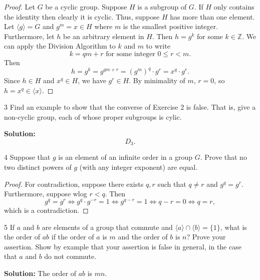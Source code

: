 \begin{proof}
    Let $G$ be a cyclic group.
    Suppose $H$ is a subgroup of $G$.
    If $H$ only contains the identity then clearly it is cyclic.
    Thus, suppose $H$ has more than one element.
    Let $\langle g \rangle = G$ and $g^m = x \in H$ where $m$ is the smallest positive integer.
    Furthermore, let $h$ be an arbitrary element in $H$.
    Then $h = g^k$ for some $k \in \mathbb{Z}$.
    We can apply the Division Algorithm to $k$ and $m$ to write
    \[k = q m + r \text{ for some integer } 0 \le r < m.\]
    Then 
    \[h = g^k = g^{q m + r} = (g^m)^q \cdot g^r = x^q \cdot g^r.\]
    Since $h \in H$ and $x^q \in H$, we have $g^r \in H$.
    By minimality of $m$, $r = 0$, so $h = x^q \in \langle x \rangle$.
\end{proof}

\begin{problem}{3}
    Find an example to show that the converse of Exercise 2 is false.
    That is, give a non-cyclic group, each of whose proper subgroups is cylic.
\end{problem}
\solved

\textbf{Solution: }
\[D_3.\]

\begin{problem}{4}
    Suppose that $g$ is an element of an infinite order 
    in a group $G$. Prove that no two distinct powers of $g$
    (with any integer exponent) are equal.
\end{problem}
\solved

\begin{proof}
    For contradiction, suppose there exists $q, r$ such that $q \ne r$ and $g^q = g^r$.
    Furthermore, suppose wlog $r < q$. Then 
    \[g^q = g^r \iff g^q \cdot g^{-r} = 1 \iff g^{q - r} = 1 \iff q - r = 0 \iff q = r,\]
    which is a contradiction.
\end{proof}

\begin{problem}{5}
    If $a$ and $b$ are elements of a group that commute and $\langle a \rangle \cap \langle b \rangle = \{1\}$,
    what is the order of $ab$ if the order of $a$ is $m$ and the order of $b$ is $n$?
    Prove your assertion. Show by example that your assertion is false in general,
    in the case that $a$ and $b$ do not commute.
\end{problem}
\solved

\textbf{Solution: } The order of $ab$ is $mn$.

